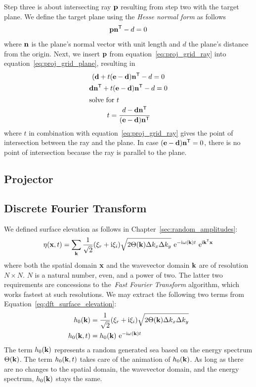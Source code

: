 Step three is about intersecting ray $\mathbf{p}$ resulting from step two with the target plane.
We define the target plane using the \textit{Hesse normal form} as follows
\begin{equation}
\label{eq:proj_grid_plane}
 \mathbf{p}\mathbf{n}^{\mathsf{T}} - d = 0
\end{equation}
where $\mathbf{n}$ is the plane's normal vector with unit length and $d$ the plane's distance
from the origin. Next, we insert $\mathbf{p}$ from equation~\ref{eq:proj_grid_ray}
into equation~\ref{eq:proj_grid_plane}, resulting in
%
\begin{gather}
\label{eq:plane_and_ray_intersection}
(\mathbf{d} + t(\mathbf{e} - \mathbf{d})\mathbf{n}^{\mathsf{T}} - d = 0\\
\mathbf{d}\mathbf{n}^{\mathsf{T}} + t(\mathbf{e} - \mathbf{d})\mathbf{n}^{\mathsf{T}} - d = 0\\
\intertext{solve for $t$}
t = \cfrac{d - \mathbf{d}\mathbf{n}^{\mathsf{T}}}{(\mathbf{e} - \mathbf{d})\mathbf{n}^{\mathsf{T}}}
\end{gather}
%
where $t$ in combination with equation~\ref{eq:proj_grid_ray} gives the point of intersection
between the ray and the plane. In case $(\mathbf{e} - \mathbf{d})\mathbf{n}^{\mathsf{T}} = 0$,
there is no point of intersection because the ray is parallel to the plane.

\subsection{Projector}

\subsection{Discrete Fourier Transform}
We defined surface elevation as follows in Chapter~\ref{sec:random_amplitudes}:
\begin{equation}
\label{eq:dft_surface_elevation}
\eta(\mathbf{x}, t) = 
\sum_{\mathbf{k}}\frac{1}{\sqrt{2}}(\xi_r+\mathrm{i}\xi_i)
\sqrt{2\Theta(\mathbf{k})\Delta k_x \Delta k_y} 
~\mathrm{e}^{-\mathrm{i}\omega(\mathbf{k})t}
~\mathrm{e}^{\mathrm{i}\mathbf{k}^{\mathsf{T}}\mathbf{x}}
\end{equation}
where both the spatial domain $\mathbf{x}$ and the wavevector domain $\mathbf{k}$ are
of resolution $N \times N$. $N$ is a natural number, even, and a power of two.
The latter two requirements are concessions to the~\emph{Fast Fourier Transform}
algorithm, which works fastest at such resolutions. We may extract the following
two terms from Equation~\ref{eq:dft_surface_elevation}:
\begin{align}
\label{eq:dft_h0}
h_0(\mathbf{k})   &= \frac{1}{\sqrt{2}}(\xi_r+\mathrm{i}\xi_i)\sqrt{2\Theta(\mathbf{k})\Delta k_x \Delta k_y} \\
h_0(\mathbf{k},t) &= h_0(\mathbf{k})~\mathrm{e}^{-\mathrm{i}\omega(\mathbf{k})t}
\end{align}
The term $h_0(\mathbf{k})$ represents a random generated sea based on the energy
spectrum $\Theta(\mathbf{k})$. The term $h_0(\mathbf{k},t)$ takes care of the
animation of $h_0(\mathbf{k})$. As long as there are no changes to the spatial domain,
the wavevector domain, and the energy spectrum, $h_0(\mathbf{k})$ stays the same.


